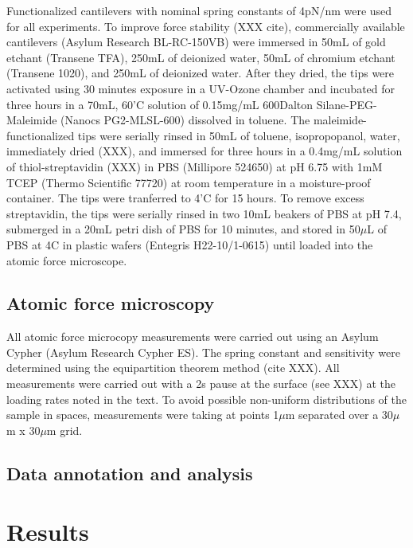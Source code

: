\documentclass[%
  aip,12pt,tightenlines,
  amsthm,
 amsmath,amssymb,
 reprint,%
]{revtex4-1}
\newcommand{\sLabel}[1]{\label{section:#1}}
\newcommand{\firstp}[0]{\noindent}
\newcommand{\pl}[0]{\vspace{6pt}}
\newcommand{\supply}[2]{(#1 #2)}
\begin{document}
\firstp Functionalized cantilevers with nominal spring constants of 4pN/nm  were used for all experiments. To improve force stability (XXX cite), commercially available cantilevers \supply{Asylum Research}{BL-RC-150VB} were immersed in 50mL of gold etchant \supply{Transene}{TFA}, 250mL of deionized water, 50mL of chromium etchant \supply{Transene}{1020}, and 250mL of deionized water. After they dried, the tips were activated using 30 minutes exposure in a UV-Ozone chamber and incubated for three hours in a 70mL, 60'C solution of 0.15mg/mL 600Dalton Silane-PEG-Maleimide \supply{Nanocs}{PG2-MLSL-600} dissolved in toluene. The maleimide-functionalized tips were serially rinsed in 50mL of toluene, isopropopanol, water, immediately dried (XXX), and immersed for three hours in a 0.4mg/mL solution of thiol-streptavidin (XXX) in PBS \supply{Millipore}{524650} at pH 6.75 with 1mM TCEP \supply{Thermo Scientific}{77720} at room temperature in a moisture-proof container. The tips were tranferred to 4'C for 15 hours. To remove excess streptavidin, the tips were serially rinsed in two 10mL beakers of PBS at pH 7.4, submerged in a 20mL petri dish of PBS for 10 minutes, and stored in 50$\mu$L of PBS at 4C in plastic wafers \supply{Entegris}{H22-10/1-0615} until loaded into the atomic force microscope. \pl

\subsection{\sLabel{Surface}Atomic force microscopy}

All atomic force microcopy measurements were carried out using an Asylum Cypher \supply{Asylum Research}{Cypher ES}. The spring constant and sensitivity were determined using the equipartition theorem method (cite XXX). All measurements were carried out with a 2s pause at the surface (see XXX) at the loading rates noted in the text. To avoid possible non-uniform distributions of the sample in spaces, measurements were taking at points 1$\mu$m separated over a 30$\mu$m x 30$\mu$m grid. 

\subsection{\sLabel{Surface}Data annotation and analysis}

\section{\sLabel{Results}Results}
\end{document}
